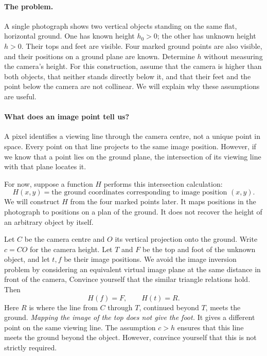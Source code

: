 \paragraph{The problem.}
A single photograph shows two vertical objects standing on the same flat,
horizontal ground. One has known height $h_0>0$; the other has unknown
height $h>0$. Their tops and feet are visible. Four marked ground points
are also visible, and their positions on a ground plane are known.
Determine $h$ without measuring the camera's height. For this construction,
assume that the camera is higher than both objects, that neither stands
directly below it, and that their feet and the point below the camera are
not collinear. We will explain why these assumptions are useful.

\paragraph{What does an image point tell us?}
A pixel identifies a viewing line through the camera centre, not a unique
point in space. Every point on that line projects to the same image
position. However, if we know that a point lies on the ground plane, the
intersection of its viewing line with that plane locates it.

For now, suppose a function $H$ performs this intersection calculation:
\[
H(x,y)=\text{the ground coordinates corresponding to image position }(x,y).
\]
We will construct $H$ from the four marked points later. It maps positions
in the photograph to positions on a plan of the ground. It does not
recover the height of an arbitrary object by itself.

Let $C$ be the camera centre and $O$ its vertical projection onto the
ground. Write $c=CO$ for the camera height. Let $T$ and $F$ be the top
and foot of the unknown object, and let $t,f$ be their image positions. We avoid the image inversion problem by considering an equivalent virtual image plane  at the same distance in front of the camera, Convince yourself that the similar triangle relations hold.
Then
\[
H(f)=F,\qquad H(t)=R.
\]
Here $R$ is where the line from $C$ through $T$, continued beyond $T$,
meets the ground. \emph{Mapping the image of the top does not give the
foot.} It gives a different point on the same viewing line. The assumption
$c>h$ ensures that this line meets the ground beyond the object. However, convince yourself that this is not strictly required.

